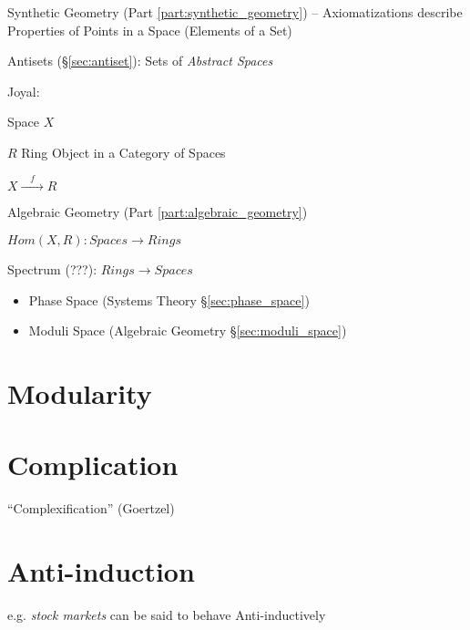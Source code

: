 Synthetic Geometry (Part \ref{part:synthetic_geometry}) -- Axiomatizations
describe Properties of Points in a Space (Elements of a Set)

Antisets (\S\ref{sec:antiset}): Sets of \emph{Abstract Spaces}

Joyal: %

Space $X$

$R$ Ring Object in a Category of Spaces

$X \xrightarrow{\quad f \quad} R$

Algebraic Geometry (Part \ref{part:algebraic_geometry})

$Hom(X,R) : Spaces \rightarrow Rings$

Spectrum (???): $Rings \rightarrow Spaces$

\begin{itemize}
  \item Phase Space (Systems Theory \S\ref{sec:phase_space})
  \item Moduli Space (Algebraic Geometry \S\ref{sec:moduli_space})
\end{itemize}



\section{Modularity}\label{sec:modularity}

\section{Complication}\label{sec:complication}

``Complexification'' (Goertzel)



\section{Anti-induction}\label{sec:anti_induction}

e.g. \emph{stock markets} can be said to behave Anti-inductively
